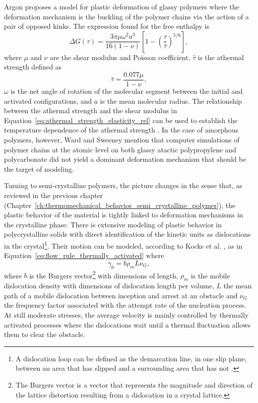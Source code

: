 Argon \citep{argonTheoryLowtemperaturePlastic1973} proposes a model for plastic deformation of glassy polymers where the deformation mechanism is the buckling of the polymer chains via the action of a pair of opposed kinks.
The expression found for the free enthalpy is
\begin{equation}
	\label{eq:argon_model_free_enthalpy}
	\Delta G(\tau)=\frac{3 \pi \mu \omega^2 a^3}{16(1-\nu)}\left[1-\left(\frac{\tau}{\hat \tau}\right)^{5 / 6}\right],
\end{equation}
where $\mu$ and $\nu$ are the shear modulus and Poisson coefficient, $\hat \tau$ is the athermal strength defined as
\begin{equation}
  \label{eq:athermal_strength_elasticity_rel}
	\hat \tau = \frac{0.077 \mu}{1-\nu},
\end{equation}
$\omega$ is the net angle of rotation of the molecular segment between the initial and activated configurations, and $a$ is the mean molecular radius.
The relationship between the athermal strength and the shear modulus in Equation~\eqref{eq:athermal_strength_elasticity_rel} can be used to establish the temperature dependence of the athermal strength \citep{haoUnifiedAmorphousCrystalline2022}.
In the case of amorphous polymers, however, Ward and Sweeney \citep{wardIntroductionMechanicalProperties2004} mention that computer simulations of polymer chains at the atomic level on both glassy atactic polypropylene and polycarbonate did not yield a dominant deformation mechanism that should be the target of modeling.

Turning to semi-crystalline polymers, the picture changes in the sense that, as reviewed in the previous chapter (Chapter~\ref{ch:thermomechanical_behavior_semi_crystalline_polymer}), the plastic behavior of the material is tightly linked to deformation mechanisms in the crystalline phase.
There is extensive modeling of plastic behavior in polycrystalline solids with direct identification of the kinetic units as dislocations in the crystal\footnote{A dislocation loop can be defined as the demarcation line, in one slip plane, between an area that has slipped and a surrounding area that has not \citep{kocks1975thermodynamics}.}.
Their motion can be modeled, according to Kocks et al. \citep{kocks1975thermodynamics}, as in Equation~\eqref{eq:flow_rule_thermally_activated} where
\begin{equation}
	\label{eq:pre_exponential_def}
	\dot \gamma_0 = b\rho_m L \nu_G,
\end{equation}
where $b$ is the Burgers vector\footnote{The Burgers vector is a vector that represents the magnitude and direction of the lattice distortion resulting from a dislocation in a crystal lattice.} with dimensions of length, $\rho_m$ is the mobile dislocation density with dimensions of dislocation length per volume, $L$ the mean path of a mobile dislocation between inception and arrest at an obstacle and $\nu_G$ the frequency factor associated with the attempt rate of the nucleation process.
At still moderate stresses, the average velocity is mainly controlled by thermally activated processes where the dislocations wait until a thermal fluctuation allows them to clear the obstacle.

